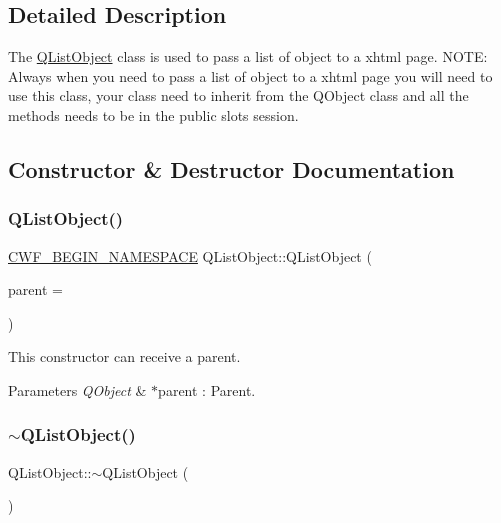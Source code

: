 \subsection{Detailed Description}
The \hyperlink{class_q_list_object}{Q\+List\+Object} class is used to pass a list of object to a xhtml page. N\+O\+TE\+: Always when you need to pass a list of object to a xhtml page you will need to use this class, your class need to inherit from the Q\+Object class and all the methods needs to be in the public slots session. 

\subsection{Constructor \& Destructor Documentation}
\mbox{\label{class_q_list_object_a83076620d8a83ebb0d2b2a4a8bd84e38}} 
\subsubsection{\texorpdfstring{Q\+List\+Object()}{QListObject()}}
{\footnotesize\ttfamily \hyperlink{cppwebframework__global_8h_a7492e9498cbaf9cd17dbc2215d3a0e48}{C\+W\+F\+\_\+\+B\+E\+G\+I\+N\+\_\+\+N\+A\+M\+E\+S\+P\+A\+CE} Q\+List\+Object\+::\+Q\+List\+Object (\begin{DoxyParamCaption}\item[{Q\+Object $\ast$}]{parent = {} }\end{DoxyParamCaption})\hspace{0.3cm}{\ttfamily [explicit]}}



This constructor can receive a parent. 


\begin{DoxyParams}{Parameters}
{\em Q\+Object} & $\ast$parent \+: Parent. \\
\hline
\end{DoxyParams}
\mbox{\label{class_q_list_object_a074ae68f366e150abacb1c4baa492bb6}} 
\subsubsection{\texorpdfstring{$\sim$\+Q\+List\+Object()}{~QListObject()}}
{\footnotesize\ttfamily Q\+List\+Object\+::$\sim$\+Q\+List\+Object (\begin{DoxyParamCaption}{ }\end{DoxyParamCaption})}



